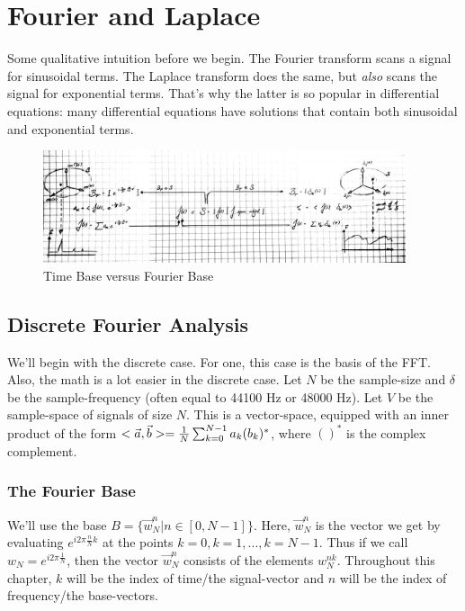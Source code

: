 \section{Fourier and Laplace}

Some qualitative intuition before we begin.
The Fourier transform scans a signal for sinusoidal terms.
The Laplace transform does the same, but \emph{also} scans the signal for exponential terms.
That's why the latter is so popular in differential equations: many differential equations have solutions that contain both sinusoidal and exponential terms. 


\begin{figure}[H]
  \caption{Time Base versus Fourier Base}
  \centering
    \includegraphics[width=0.95\textwidth]{images/fourier_base.jpg}
\end{figure}


\subsection{Discrete Fourier Analysis}

We'll begin with the discrete case. For one, this case is the basis of the FFT. Also, the math is a lot easier in the discrete case.
Let $N$ be the sample-size and $\delta$ be the sample-frequency (often equal to 44100 Hz or 48000 Hz).
Let $V$ be the sample-space of signals of size $N$. This is a vector-space,
equipped with an inner product of the form $< \vec{a} , \vec{b} > = \frac{1}{N} \sum_{k=0}^{N-1} a_k (b_k)^*$,
where $()^*$ is the complex complement.

\subsubsection{The Fourier Base}




We'll use the base $B = \{ \vec{w}_N^n | n \in [0, N-1]\}$. Here, $\vec{w}_N^n$ is the vector we get
by evaluating $e^{i 2\pi \frac{n}{N} k}$ at the points $k=0, k=1, ..., k=N-1$.
Thus if we call $w_N = e^{i 2 \pi \frac{1}{N}}$, then the vector $\vec{w}_N^n$ consists of the elements $w_N^{nk}$.
Throughout this chapter, $k$ will be the index of time/the signal-vector and $n$ will be the index of frequency/the base-vectors.

